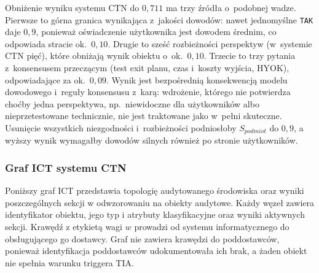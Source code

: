 Obniżenie wyniku systemu CTN do $0{,}711$ ma trzy źródła o~podobnej wadze. Pierwsze to górna granica wynikająca z~jakości dowodów: nawet jednomyślne \texttt{TAK} daje $0{,}9$, ponieważ oświadczenie użytkownika jest dowodem średnim, co odpowiada stracie ok.\ $0{,}10$. Drugie to sześć rozbieżności perspektyw (w~systemie CTN pięć), które obniżają wynik obiektu o~ok.\ $0{,}10$. Trzecie to trzy pytania z~konsensusem przeczącym (test exit planu, czas i~koszty wyjścia, HYOK), odpowiadające za ok.\ $0{,}09$. Wynik jest bezpośrednią konsekwencją modelu dowodowego i~reguły konsensusu z~karą: wdrożenie, którego nie potwierdza choćby jedna perspektywa, np.\ niewidoczne dla użytkowników albo nieprzetestowane technicznie, nie jest traktowane jako w~pełni skuteczne. Usunięcie wszystkich niezgodności i~rozbieżności podniosłoby $S_{podmiot}$ do $0{,}9$, a wyższy wynik wymagałby dowodów silnych również po stronie użytkowników.

\subsubsection*{Graf ICT systemu CTN}

Poniższy graf ICT przedstawia topologię audytowanego środowiska oraz wyniki poszczególnych sekcji w odwzorowaniu na obiekty audytowe. Każdy węzeł zawiera identyfikator obiektu, jego typ i atrybuty klasyfikacyjne oraz wyniki aktywnych sekcji. Krawędź z etykietą wagi $w$ prowadzi od systemu informatycznego do obsługującego go dostawcy. Graf nie zawiera krawędzi do poddostawców, ponieważ identyfikacja poddostawców udokumentowała ich brak, a żaden obiekt nie spełnia warunku triggera TIA.

